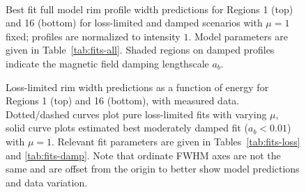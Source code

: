\documentclass[manuscript]{aastex}  %
\newcommand*{\abt}{\mathord{\sim}} %
\begin{document}
\begin{figure}
    \centering
    \iftoggle{manuscript}{
        \epsscale{0.5}
    }{}
     \\
    \caption{Best fit full model rim profile width predictions for Regions 1
        (top) and 16 (bottom) for loss-limited and damped scenarios with
        $\mu = 1$ fixed; profiles are normalized to intensity $1$.  Model
        parameters are given in Table~\ref{tab:fits-all}.  Shaded regions on
        damped profiles indicate the magnetic field damping lengthscale $a_b$.
        \label{fig:rims}}
\end{figure}

\begin{figure}
    \centering
    \iftoggle{manuscript}{
        \texttt{[image: figures/energywidth-01.pdf]}
        \texttt{[image: figures/energywidth-16.pdf]}
    }{
        \texttt{[image: figures/energywidth-01.pdf]}
        \texttt{[image: figures/energywidth-16.pdf]}
    }
    \caption{Loss-limited rim width predictions as a function of energy for
    Regions 1 (top) and 16 (bottom), with measured data.  Dotted/dashed curves
    plot pure loss-limited fits with varying $\mu$, solid curve plots estimated
    best moderately damped fit ($a_b < 0.01$) with $\mu = 1$.  Relevant fit
    parameters are given in Tables~\ref{tab:fits-loss} and \ref{tab:fits-damp}.
    Note that ordinate FWHM axes are not the same and are offset from the
    origin to better show model predictions and data variation.
    \label{fig:fits}}
\end{figure}

\begin{figure*}
    \centering
    \iftoggle{manuscript}{
        \texttt{[image: figures/energywidth-subplot.pdf]}
    }{
        \plotone{figures/energywidth-subplot.pdf}
    }
    \caption{Rim width predictions for loss-limited and damped fits with
    $\mu = 1$ fixed for all regions.  Neither loss-limited nor damped fits
    are clearly favored in describing the data.  Some damped model predictions
    (e.g., Region 5) are not given at low energies if FWHMs cannot be
    calculated for model profiles (modeled intensity behind thin rim exceeds
    half-maximum of rim peak within model domain of $\abt 20\arcsec$).
    Corresponding best fit parameters are given in Table~\ref{tab:fits-all}.
    As in Figure~\ref{fig:fits}, $y$-axis limits vary and are offset from the
    origin to better show model predictions and data.
    \label{fig:fits-all}}
\end{figure*}
\end{document}
